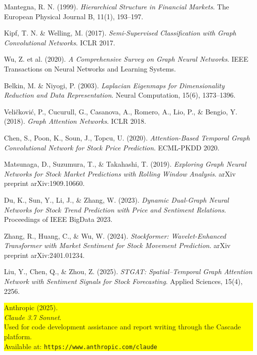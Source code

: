 \documentclass[12pt]{article}
\begin{document}

\begin{thebibliography}{12}

Mantegna, R. N. (1999). 
\textit{Hierarchical Structure in Financial Markets}. 
The European Physical Journal B, 11(1), 193--197.

Kipf, T. N. \& Welling, M. (2017). 
\textit{Semi-Supervised Classification with Graph Convolutional Networks}. 
ICLR 2017.

Wu, Z. et al. (2020). 
\textit{A Comprehensive Survey on Graph Neural Networks}. 
IEEE Transactions on Neural Networks and Learning Systems.

Belkin, M. \& Niyogi, P. (2003). 
\textit{Laplacian Eigenmaps for Dimensionality Reduction and Data Representation}. 
Neural Computation, 15(6), 1373--1396.

Veličković, P., Cucurull, G., Casanova, A., Romero, A., Lio, P., \& Bengio, Y. (2018).
\textit{Graph Attention Networks}.
ICLR 2018.

Chen, S., Poon, K., Soun, J., Topcu, U. (2020).
\textit{Attention-Based Temporal Graph Convolutional Network for Stock Price Prediction}.
ECML-PKDD 2020.

Matsunaga, D., Suzumura, T., \& Takahashi, T. (2019).
\textit{Exploring Graph Neural Networks for Stock Market Predictions with Rolling Window Analysis}.
arXiv preprint arXiv:1909.10660.

Du, K., Sun, Y., Li, J., \& Zhang, W. (2023).
\textit{Dynamic Dual-Graph Neural Networks for Stock Trend Prediction with Price and Sentiment Relations}.
Proceedings of IEEE BigData 2023.

Zhang, R., Huang, C., \& Wu, W. (2024).
\textit{Stockformer: Wavelet-Enhanced Transformer with Market Sentiment for Stock Movement Prediction}.
arXiv preprint arXiv:2401.01234.

Liu, Y., Chen, Q., \& Zhou, Z. (2025).
\textit{STGAT: Spatial–Temporal Graph Attention Network with Sentiment Signals for Stock Forecasting}.
Applied Sciences, 15(4), 2256.

\colorbox{yellow}{%
\parbox{\linewidth}{%
Anthropic (2025).\\
\textit{Claude 3.7 Sonnet}.\\
Used for code development assistance and report writing through the Cascade platform.\\
Available at: \texttt{https://www.anthropic.com/claude}
}%
}

\end{thebibliography}
\end{document}
